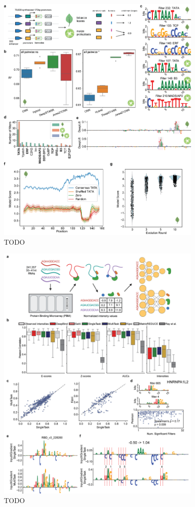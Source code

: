 \begin{figure}[p]
    \centering
    \includegraphics[width=0.9\textwidth, height=0.745\textheight]{1_figures-and-files/figure2.png}
    \caption[TODO]{TODO  
    }
    \label{fig:2}
\end{figure}

\begin{figure}[p]
    \centering
    \includegraphics[width=0.9\textwidth, height=0.745\textheight]{1_figures-and-files/extended_data_figure1.png}
    \caption[TODO]{TODO  
    }
    \label{fig:3 Extended Data Figure 1}
\end{figure}

